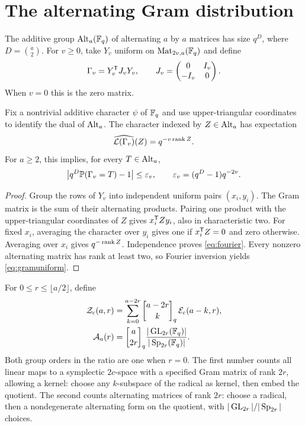 \section{The alternating Gram distribution}\label{sec:gram}

The additive group $\operatorname{Alt}_a(\mathbb F_q)$ of alternating $a$ by $a$ matrices
has size $q^D$, where $D=\binom a2$.
For $v\ge0$, take $Y_v$ uniform on $\operatorname{Mat}_{2v,a}(\mathbb F_q)$ and define
\begin{equation}\label{eq:Gamma}
 \Gamma_v=Y_v^{\mathsf T}J_vY_v,\qquad
 J_v=\begin{pmatrix}0&I_v\\-I_v&0\end{pmatrix}.
\end{equation}
When $v=0$ this is the zero matrix.

\begin{lemma}\label{lem:fourier}
Fix a nontrivial additive character $\psi$ of $\mathbb F_q$ and use
upper-triangular coordinates to identify the dual of $\operatorname{Alt}_a$.
The character indexed by $Z\in\operatorname{Alt}_a$ has expectation
\begin{equation}\label{eq:fourier}
 \widehat{\mathcal L(\Gamma_v)}(Z)=q^{-v\operatorname{rank} Z}.
\end{equation}
For $a\ge2$, this implies, for every $T\in\operatorname{Alt}_a$,
\begin{equation}\label{eq:gramuniform}
 \left|q^D\mathbb P(\Gamma_v=T)-1\right|\le\varepsilon_v,\qquad
 \varepsilon_v=(q^D-1)q^{-2v}.
\end{equation}
\end{lemma}

\begin{proof}
Group the rows of $Y_v$ into independent uniform pairs $(x_i,y_i)$.
The Gram matrix is the sum of their alternating products. Pairing
one product with the upper-triangular coordinates of $Z$ gives
$x_i^{\mathsf T}Zy_i$, also in characteristic two.
For fixed $x_i$, averaging the character over $y_i$ gives one if
$x_i^{\mathsf T}Z=0$ and zero otherwise. Averaging over $x_i$ gives
$q^{-\operatorname{rank} Z}$. Independence proves \eqref{eq:fourier}.
Every nonzero alternating matrix has rank at least two, so
Fourier inversion yields \eqref{eq:gramuniform}.
\end{proof}

For $0\le r\le\lfloor a/2\rfloor$, define
\begin{align}
 \mathcal Z_c(a,r)
   &=\sum_{k=0}^{a-2r}\gb{a-2r}{k}\,
                    \mathcal E_c(a-k,r),\label{eq:Z}\\
 \mathcal A_a(r)
   &=\gb a{2r}\frac{|\GL_{2r}(\F_q)|}{|\Sp_{2r}(\F_q)|}.
                    \label{eq:A}
\end{align}
Both group orders in the ratio are one when $r=0$.
The first number counts all linear maps to a symplectic $2c$-space
with a specified Gram matrix of rank $2r$, allowing a kernel:
choose any $k$-subspace of the radical as kernel, then embed the quotient.
The second counts alternating matrices of rank $2r$: choose a radical,
then a nondegenerate alternating form on the quotient, with
$|\operatorname{GL}_{2r}|/|\operatorname{Sp}_{2r}|$ choices.

